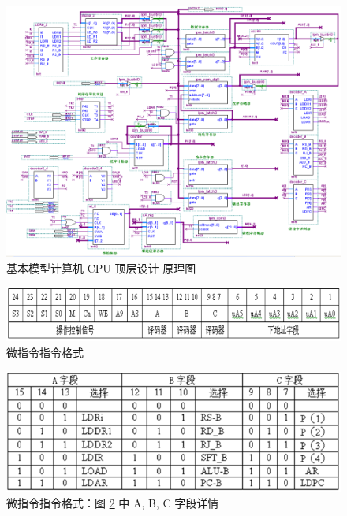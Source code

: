 \begin{figure}[H]
\centering
\includegraphics[width=\textwidth]{images/prin6_1.png}
\caption{基本模型计算机 CPU 顶层设计 原理图}
\label{fig:prin6_1}
\end{figure}

\begin{figure}[H]
\centering
\includegraphics[width=\textwidth]{images/prin6_2.png}
\caption{微指令指令格式}
\label{fig:prin6_2}
\end{figure}

\begin{figure}[H]
\centering
\includegraphics[width=\textwidth]{images/prin6_3.png}
\caption{微指令指令格式：图 \ref{fig:prin6_2} 中 A, B, C 字段详情}
\label{fig:prin6_3}
\end{figure}

